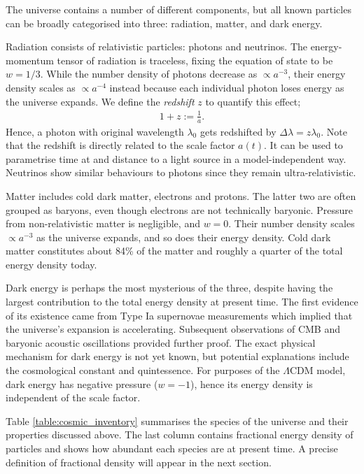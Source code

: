 The universe contains a number of different components, but all known particles can be broadly categorised into three: radiation, matter, and dark energy.

Radiation consists of relativistic particles: photons and neutrinos. The energy-momentum tensor of radiation is traceless, fixing the equation of state to be $w=1/3$. While the number density of photons decrease as $\propto a^{-3}$, their energy density scales as $\propto a^{-4}$ instead because each individual photon loses energy as the universe expands. We define the \textit{redshift} $z$ to quantify this effect;
\begin{align}
	1 + z := \frac{1}{a}.	\label{def:redshift}
\end{align}
Hence, a photon with original wavelength $\lambda_0$ gets redshifted by $\Delta\lambda = z \lambda_0$. Note that the redshift is directly related to the scale factor $a(t)$. It can be used to parametrise time at and distance to a light source in a model-independent way. Neutrinos show similar behaviours to photons since they remain ultra-relativistic.

Matter includes cold dark matter, electrons and protons. The latter two are often grouped as baryons, even though electrons are not technically baryonic. Pressure from non-relativistic matter is negligible, and $w = 0$. Their number density scales $\propto a^{-3}$ as the universe expands, and so does their energy density. Cold dark matter constitutes about 84\% of the matter and roughly a quarter of the total energy density today.

Dark energy is perhaps the most mysterious of the three, despite having the largest contribution to the total energy density at present time. The first evidence of its existence came from Type Ia supernovae measurements which implied that the universe's expansion is accelerating. Subsequent observations of CMB and baryonic acoustic oscillations provided further proof. The exact physical mechanism for dark energy is not yet known, but potential explanations include the cosmological constant and quintessence. For purposes of the $\Lambda$CDM model, dark energy has negative pressure ($w=-1$), hence its energy density is independent of the scale factor.

Table \ref{table:cosmic_inventory} summarises the species of the universe and their properties discussed above. The last column contains fractional energy density of particles and shows how abundant each species are at present time. A precise definition of fractional density will appear in the next section.

